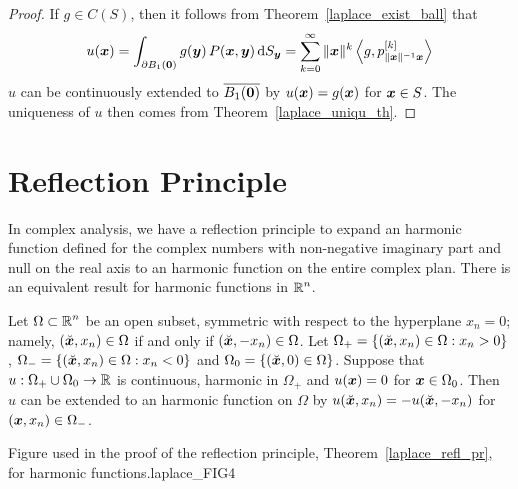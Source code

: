 \begin{proof}
If $g \in C(S)$, then it follows from Theorem~\ref{laplace_exist_ball} that
\[
u({\bm{x}}) = \int_{\partial B_1({\bm{0}})} g({\bm{y}}) \,
P({\bm{x}},{\bm{y}}) \,\mathrm{d}{S}_{{\bm{y}}}
= \sum_{k=0}^\infty \|{\bm{x}}\|^k \left\langle{g} , {p_{\|{\bm{x}}\|^{-1} {\bm{x}}}^{[k]}}\right\rangle
\]
$u$ can be continuously extended to $\overline{B_1({\bm{0}})}$ by
$u({\bm{x}}) = g({\bm{x}})$ for ${\bm{x}} \in S$.
The uniqueness of $u$ then comes from Theorem~\ref{laplace_uniqu_th}.
\end{proof}

\section{Reflection Principle}

In complex analysis, we have a reflection principle to expand an
harmonic function defined for the complex numbers with non-negative
imaginary part and null on the real axis to an harmonic function on
the entire complex plan.  There is an equivalent result for harmonic
functions in $\displaystyle \mathbb{R}^n$.

\begin{theorem} \label{laplace_refl_pr}
Let $\displaystyle \Omega \subset \mathbb{R}^n$ be an open subset, symmetric
with respect to the hyperplane $x_n=0$; namely,
$(\breve{{\bm{x}}},x_n) \in \Omega$ if and only if 
$(\breve{{\bm{x}}},-x_n) \in \Omega$.  Let
$\displaystyle \Omega_+
= \left\{ (\breve{{\bm{x}}},x_n) \in \Omega : x_n>0 \right\}$,
$\displaystyle \Omega_-
= \left\{ (\breve{{\bm{x}}},x_n) \in \Omega : x_n<0 \right\}$ and
$\displaystyle \Omega_0 = \left\{ (\breve{{\bm{x}}},0) \in \Omega \right\}$.
Suppose that $u:\Omega_+\cup \Omega_0 \rightarrow \mathbb{R}$ is continuous,
harmonic in $\Omega_+$ and $u({\bm{x}})=0$ for ${\bm{x}} \in \Omega_0$.
Then $u$ can be extended to an harmonic function on $\Omega$ by
$u(\breve{{\bm{x}}},x_n) = -u(\breve{{\bm{x}}},-x_n)$ for
$({\bm{x}},x_n)\in \Omega_-$.
\end{theorem}

{Figure used in the proof of the reflection principle,
Theorem~\ref{laplace_refl_pr}, for harmonic functions.}{laplace_FIG4}

